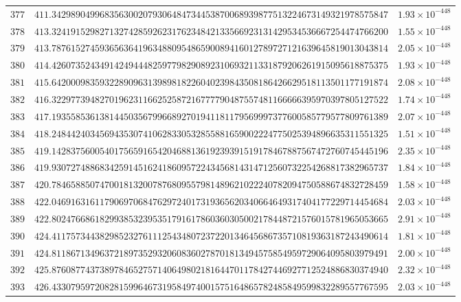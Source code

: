 \documentclass[12pt,reqno]{amsart}
\theoremstyle{remark}
\begin{document}
\begin{longtable}{clc}
$377$ & $411.3429890499683563002079306484734453870068939877513224673149321978575847$ & $1.93\times 10^{-448}$ \\
$378$ & $413.3241915298271327428592623176234842133566923131429534536667254474766200$ & $1.55\times 10^{-448}$ \\
$379$ & $413.7876152745936563641963488095486590089416012789727121639645819013043814$ & $2.05\times 10^{-448}$ \\
$380$ & $414.4260735243491424944482597798290892310693211331879206261915095618875375$ & $1.93\times 10^{-448}$ \\
$381$ & $415.6420009835932289096313989818226040239843508186426629518113501177191874$ & $2.08\times 10^{-448}$ \\
$382$ & $416.3229773948270196231166252587216777790487557481166666395970397805127522$ & $1.74\times 10^{-448}$ \\
$383$ & $417.1935585361381445035679966892701941181179569997377600585779577809761389$ & $2.07\times 10^{-448}$ \\
$384$ & $418.2484424034569435307410628330532855881659002224775025394896635311551325$ & $1.51\times 10^{-448}$ \\
$385$ & $419.1428375600540175659165420468813619239391519178467887567472760745445196$ & $2.35\times 10^{-448}$ \\
$386$ & $419.9307274886834259145162418609572243456814314712560732254268817382965737$ & $1.84\times 10^{-448}$ \\
$387$ & $420.7846588507470018132007876809557981489621022240782094750588674832728459$ & $1.58\times 10^{-448}$ \\
$388$ & $422.0469163161179069706847629724017319365620340664649317404177229714454684$ & $2.03\times 10^{-448}$ \\
$389$ & $422.8024766861829938532395351791617860360305002178448721576015781965053665$ & $2.91\times 10^{-448}$ \\
$390$ & $424.4117573443829852327611125434807237220134645686735710819363187243490614$ & $1.81\times 10^{-448}$ \\
$391$ & $424.8118671349637218973529320608360278701813494575854959729064095803979491$ & $2.00\times 10^{-448}$ \\
$392$ & $425.8760877437389784652757140649802181644701178427446927712524886830374940$ & $2.32\times 10^{-448}$ \\
$393$ & $426.4330795972082815996467319584974001575164865782485849599832289557767595$ & $2.03\times 10^{-448}$ \\

\end{longtable}
\end{document}
